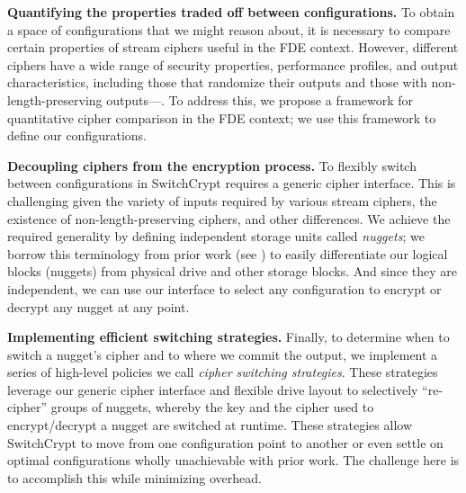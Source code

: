 \textbf{Quantifying the properties traded off between configurations.} To obtain
a space of configurations that we might reason about, it is necessary to compare
certain properties of stream ciphers useful in the FDE context. However,
different ciphers have a wide range of security properties, performance
profiles, and output characteristics, including those that randomize their
outputs and those with non-length-preserving outputs---. To address this, we propose a framework for
quantitative cipher comparison in the FDE context; we use this framework to
define our configurations.

\textbf{Decoupling ciphers from the encryption process.} To flexibly switch
between configurations in SwitchCrypt requires a generic cipher interface. This
is challenging given the variety of inputs required by various stream ciphers,
the existence of non-length-preserving ciphers, and other differences. We
achieve the required generality by defining independent storage units called
\emph{nuggets}; we borrow this terminology from prior work (see
\cite{StrongBox}) to easily differentiate our logical blocks (nuggets) from
physical drive and other storage blocks. And since they are independent, we can
use our interface to select any configuration to encrypt or decrypt any nugget
at any point.

\textbf{Implementing efficient switching strategies.} Finally, to determine when
to switch a nugget's cipher and to where we commit the output, we implement a
series of high-level policies we call \textit{cipher switching strategies}.
These strategies leverage our generic cipher interface and flexible drive layout
to selectively ``re-cipher'' groups of nuggets, whereby the key and the cipher
used to encrypt/decrypt a nugget are switched at runtime. These strategies allow
SwitchCrypt to move from one configuration point to another or even settle on
optimal configurations wholly unachievable with prior work. The challenge here
is to accomplish this while minimizing overhead.

